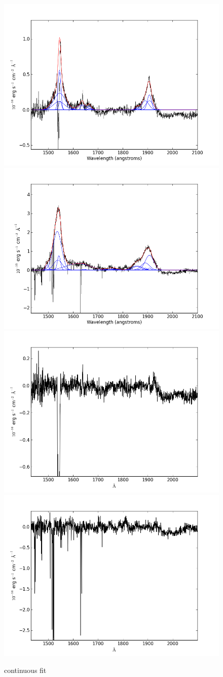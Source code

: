 \documentclass[usenatbib]{mn2e}
\begin{document}
\newpage


\begin{figure}
\begin{center}
\includegraphics[width=0.46\linewidth,angle=0]{C_4.png}
\vspace{5mm}
\includegraphics[width=0.49\linewidth,angle=0]{C_5.png}\\
\includegraphics[width=0.46\linewidth,angle=0]{C_res_4.png}
\hspace{5mm}
\includegraphics[width=0.49\linewidth,angle=0]{C_res_5.png}\\
\end{center} 
\caption{continuous fit \label{fig:landscape}}   
\end{figure}
\end{document}
